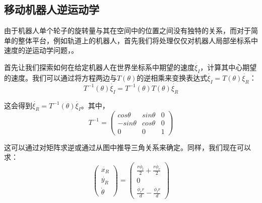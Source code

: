 
\subsection{移动机器人逆运动学}
\label{sec:ivkmobile}
由于机器人单个轮子的旋转量与其在空间中的位置之间没有独特的关系，而对于简单的整体平台，例如轨道上的机器人，首先我们将处理仅仅对机器人局部坐标系中速度的逆运动学问题，。

首先让我们探索如何在给定机器人在世界坐标系中期望的速度$\dot{\xi_I}$，计算其中心期望的速度。我们可以通过将方程两边与$T(\theta)$的逆相乘来变换表达式$\dot{\xi_I}=T(\theta)\dot{\xi_R}$：
\begin{equation}\label{eq:mbik}
T^{-1}(\theta)\dot{\xi_I}=T^{-1}(\theta)T(\theta)\dot{\xi_R}
\end{equation}

这会得到$ \dot{\xi_R}=T^{-1}(\theta)\dot{\xi_I}$。其中，
\begin{equation}
T^{-1}=\left(\begin{array}{ccc}cos \theta & sin \theta & 0 \\-sin \theta & cos \theta & 0 \\0 & 0 & 1\end{array}\right)
\end{equation}


这可以通过对矩阵求逆或通过从图中推导三角关系来确定。同样，我们现在可以求：
\begin{equation}
\left(\begin{array}{c} \dot{x_R}\\\dot{y_R}\\\dot{\theta}\end{array}\right)=\left(\begin{array}{c}\frac{r\dot{\phi_l}}{2}+\frac{r\dot{\phi_r}}{2}\\0\\\frac{\dot{\phi_r} r}{d}-\frac{\dot{\phi_l} r}{d}\end{array}\right)
\end{equation}

